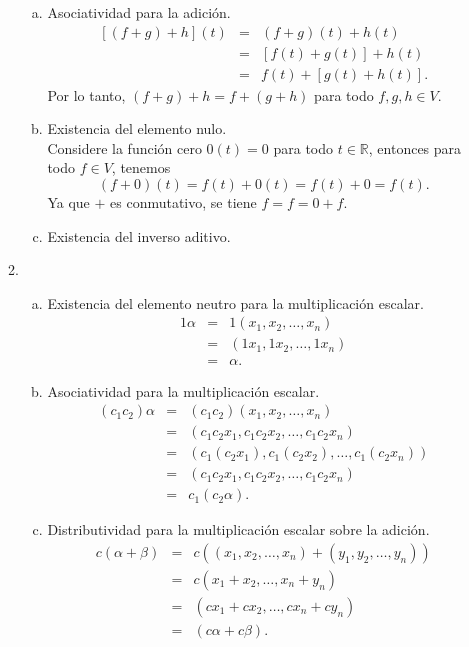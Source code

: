 \begin{enumerate}[\bfseries 1.]
\begin{enumerate}[(1)]
\begin{enumerate}[(a)]
		    \item Asociatividad para la adición.
			$$
			\begin{array}{rcl}
			    \left[(f+g)+h\right](t) &=& (f+g)(t)+h(t)\\
						    &=& \left[f(t)+g(t)\right]+h(t)\\
						    &=& f(t)+\left[g(t)+h(t)\right].
			\end{array}
			$$
			Por lo tanto, $(f+g)+h=f+(g+h)$ para todo $f,g,h\in V$.\\

		    \item Existencia del elemento nulo.\\
			Considere la función cero $0(t)=0$ para todo $t\in \mathbb{R}$, entonces para todo $f\in V$, tenemos
			$$(f+0)(t)=f(t)+0(t)=f(t)+0=f(t).$$
			Ya que $+$ es conmutativo, se tiene $f=f=0+f.$\\
			
		    \item Existencia del inverso aditivo.

		\end{enumerate}

	    \item 
		\begin{enumerate}[(a)]
		    \item Existencia del elemento neutro para la multiplicación escalar.
			$$
			\begin{array}{rcl}
			    1\alpha & = & 1(x_1,x_2,\ldots,x_n)\\
			    & = & (1x_1,1x_2,\ldots,1x_n)\\
			    & = & \alpha.
			\end{array}
			$$
		    \item Asociatividad para la multiplicación escalar.\\
			$$
			\begin{array}{rcl}
			    (c_1c_2)\alpha & = & (c_1c_2)(x_1,x_2,\ldots,x_n)\\
			    & = & (c_1c_2x_1,c_1c_2x_2,\ldots,c_1c_2x_n)\\
			    & = & (c_1(c_2x_1),c_1(c_2x_2),\ldots,c_1(c_2x_n))\\
			    & = & (c_1c_2x_1,c_1c_2x_2,\ldots,c_1c_2x_n)\\
			    & = & c_1(c_2\alpha).
			\end{array}
			$$

		    \item Distributividad para la multiplicación escalar sobre la adición.
			$$
			\begin{array}{rcl}
			    c(\alpha+\beta) & = & c((x_1,x_2,\ldots,x_n)+(y_1,y_2,\ldots, y_n))\\
			    & = & c(x_1+x_2,\ldots,x_n+y_n)\\
			    & = & (cx_1+cx_2,\ldots,cx_n+cy_n)\\
			    & = & (c\alpha+c\beta).
			\end{array}
			$$


\end{enumerate}
\end{enumerate}
\end{enumerate}
